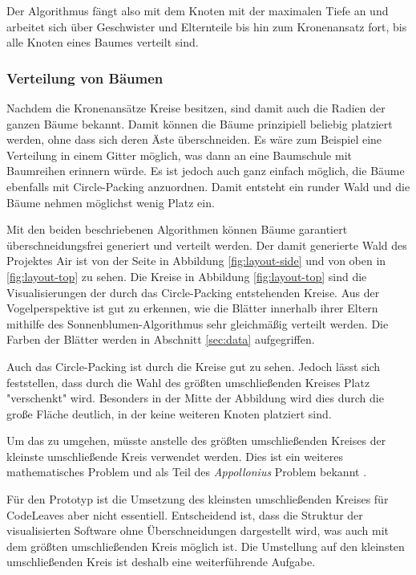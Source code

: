 Der Algorithmus fängt also mit dem Knoten mit der maximalen Tiefe an und arbeitet sich über Geschwister und Elternteile bis hin zum Kronenansatz fort, bis alle Knoten eines Baumes verteilt sind.

\subsubsection*{Verteilung von Bäumen}


Nachdem die Kronenansätze Kreise besitzen, sind damit auch die Radien der ganzen Bäume bekannt. Damit können die Bäume prinzipiell beliebig platziert werden, ohne dass sich deren Äste überschneiden. Es wäre zum Beispiel eine Verteilung in einem Gitter möglich, was dann an eine Baumschule mit Baumreihen erinnern würde. Es ist jedoch auch ganz einfach möglich, die Bäume ebenfalls mit Circle-Packing anzuordnen. Damit entsteht ein runder Wald und die Bäume nehmen möglichst wenig Platz ein.

Mit den beiden beschriebenen Algorithmen können Bäume garantiert überschneidungsfrei generiert und verteilt werden. Der damit generierte Wald des Projektes Air ist von der Seite in Abbildung \ref{fig:layout-side} und von oben in \ref{fig:layout-top} zu sehen. Die Kreise in Abbildung \ref{fig:layout-top} sind die Visualisierungen der durch das Circle-Packing entstehenden Kreise. Aus der Vogelperspektive ist gut zu erkennen, wie die Blätter innerhalb ihrer Eltern mithilfe des Sonnenblumen-Algorithmus sehr gleichmäßig verteilt werden. Die Farben der Blätter werden in Abschnitt \ref{sec:data} aufgegriffen.

Auch das Circle-Packing ist durch die Kreise gut zu sehen. Jedoch lässt sich feststellen, dass durch die Wahl des größten umschließenden Kreises Platz "verschenkt" wird. Besonders in der Mitte der Abbildung wird dies durch die große Fläche deutlich, in der keine weiteren Knoten platziert sind.

Um das zu umgehen, müsste anstelle des größten umschließenden Kreises der kleinste umschließende Kreis verwendet werden. Dies ist ein weiteres mathematisches Problem und als Teil des \textit{Appollonius} Problem bekannt \cite{dergiades2007soddy}.

Für den Prototyp ist die Umsetzung des kleinsten umschließenden Kreises für CodeLeaves aber nicht essentiell. Entscheidend ist, dass die Struktur der visualisierten Software ohne Überschneidungen dargestellt wird, was auch mit dem größten umschließenden Kreis möglich ist. Die Umstellung auf den kleinsten umschließenden Kreis ist deshalb eine weiterführende Aufgabe.


